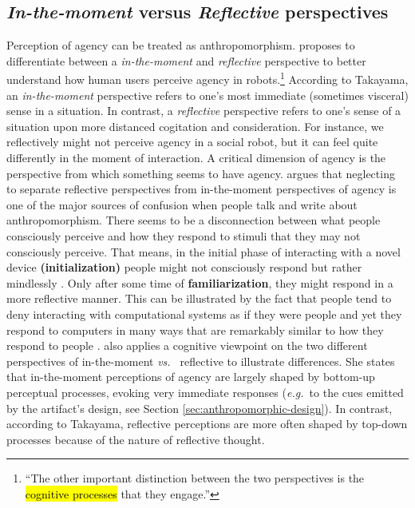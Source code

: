 \documentclass{frontiersSCNS} %
\newcommand{\eg}{{\textit{e.g.~}}}
\newcommand{\vs}{{\textit{vs.~}}}
\begin{document}

\subsection{\emph{In-the-moment} versus \emph{Reflective} perspectives}


Perception of agency can be treated as anthropomorphism.
\citep{takayama_perspectives_2012} proposes to differentiate between a
\textit{in-the-moment} and \textit{reflective} perspective to better understand
how human users perceive agency in robots.\footnote{``The other important
distinction between the two perspectives is the \hl{cognitive processes} that
they engage.''} According to Takayama, an \textit{in-the-moment} perspective
refers to one's most immediate (sometimes visceral) sense in a situation. In
contrast, a \textit{reflective} perspective refers to one's sense of a situation
upon more distanced cogitation and consideration. For instance, we reflectively
might not perceive agency in a social robot, but it can feel quite differently
in the moment of interaction. A critical dimension of agency is the perspective
from which something seems to have agency.  \cite{takayama_perspectives_2012}
argues that neglecting to separate reflective perspectives from in-the-moment
perspectives of agency is one of the major sources of confusion when people talk
and write about anthropomorphism. There seems to be a disconnection between what
people consciously perceive and how they respond to stimuli that they may not
consciously perceive.  That means, in the initial phase of interacting with a
novel device \textbf{(initialization)} people might not consciously respond but
rather mindlessly \citep{nass_machines_2000}. Only after some time of
\textbf{familiarization}, they might respond in a more reflective manner. This
can be illustrated by the fact that people tend to deny interacting with
computational systems as if they were people and yet they respond to computers
in many ways that are remarkably similar to how they respond to people
\citep{reeves_media_1996}.  \cite{takayama_perspectives_2012} also applies a
cognitive viewpoint on the two different perspectives of in-the-moment \vs
reflective to illustrate differences. She states that in-the-moment perceptions
of agency are largely shaped by bottom-up perceptual processes, evoking very
immediate responses (\eg to the cues emitted by the artifact's design, see
Section \ref{sec:anthropomorphic-design}).  In contrast, according to Takayama,
reflective perceptions are more often shaped by top-down processes because of
the nature of reflective thought.
\end{document}
